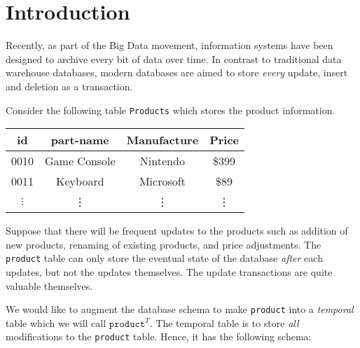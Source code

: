 \section{Introduction}

Recently, as part of the Big Data movement,
information systems have been designed to archive every bit of 
data over time. In contrast to traditional data warehouse databases, modern
databases are aimed to store {\em every} update, insert and deletion as a
transaction.

\begin{example}
    Consider the following table {\tt Products} which stores the product
    information.

    \vspace{1em}

    \begin{center}
        \small
        \begin{tabular}{|c|c|c|c|} \hline
            id & part-name & Manufacture & Price \\ \hline
            0010 & Game Console &  Nintendo & \$399 \\ \hline
            0011 & Keyboard &  Microsoft & \$89 \\ \hline
            $\vdots$ & \vdots & \vdots & \vdots \\ \hline
        \end{tabular}
    \end{center}

    \vspace{1em}

    Suppose that there will be frequent updates to the products such as
    addition of new products, renaming of existing products, and price
    adjustments. The {\tt product} table can only store the eventual state of
    the database {\em after} each updates, but not the updates themselves.  The
    update transactions are quite valuable themselves.

    We would like to augment the database schema to make {\tt product} into a
    {\em temporal} table which we will call $\mathtt{product}^T$. The temporal
    table is to store {\em all} modifications to the {\tt product} table.
    Hence, it has the following schema:


\end{example}

